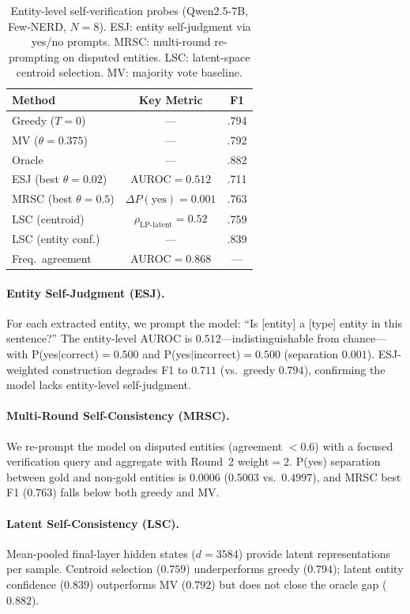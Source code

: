 \begin{table}[t]
\centering
\small
\caption{Entity-level self-verification probes (Qwen2.5-7B, Few-NERD, $N{=}8$). ESJ: entity self-judgment via yes/no prompts. MRSC: multi-round re-prompting on disputed entities. LSC: latent-space centroid selection. MV: majority vote baseline.}
\label{tab:self_verification}
\begin{tabular}{@{}lcc@{}}
\toprule
Method & Key Metric & F1 \\
\midrule
Greedy ($T{=}0$) & --- & .794 \\
MV ($\theta{=}0.375$) & --- & .792 \\
Oracle & --- & .882 \\
\midrule
ESJ (best $\theta{=}0.02$) & AUROC${=}0.512$ & .711 \\
MRSC (best $\theta{=}0.5$) & $\Delta P(\text{yes}){=}0.001$ & .763 \\
LSC (centroid) & $\rho_{\text{LP-latent}}{=}0.52$ & .759 \\
LSC (entity conf.) & --- & .839 \\
\midrule
Freq.\ agreement & AUROC${=}0.868$ & --- \\
\bottomrule
\end{tabular}
\end{table}

\paragraph{Entity Self-Judgment (ESJ).}
For each extracted entity, we prompt the model: ``Is [entity] a [type] entity in this sentence?''
The entity-level AUROC is $0.512$---indistinguishable from chance---with P(yes$|$correct)${=}0.500$ and P(yes$|$incorrect)${=}0.500$ (separation $0.001$).
ESJ-weighted construction degrades F1 to $0.711$ (vs.\ greedy $0.794$), confirming the model lacks entity-level self-judgment.

\paragraph{Multi-Round Self-Consistency (MRSC).}
We re-prompt the model on disputed entities (agreement ${<}0.6$) with a focused verification query and aggregate with Round~2 weight${=}2$.
P(yes) separation between gold and non-gold entities is $0.0006$ ($0.5003$ vs.\ $0.4997$), and MRSC best F1 ($0.763$) falls below both greedy and MV.

\paragraph{Latent Self-Consistency (LSC).}
Mean-pooled final-layer hidden states ($d{=}3584$) provide latent representations per sample.
Centroid selection ($0.759$) underperforms greedy ($0.794$); latent entity confidence ($0.839$) outperforms MV ($0.792$) but does not close the oracle gap ($0.882$).

